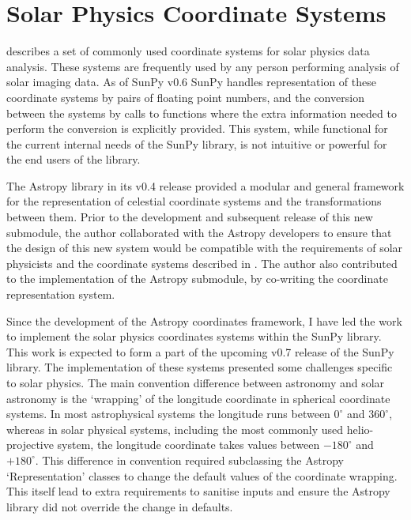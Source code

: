 \documentclass[a4paper,12pt,fourier,authoryear,custommargin]{Classes/PhDThesisPSnPDF}
\begin{document}
\section{Solar Physics Coordinate Systems}

\cite{thompson2006} describes a set of commonly used coordinate systems for solar physics data analysis.
These systems are frequently used by any person performing analysis of solar imaging data.
As of SunPy v0.6 SunPy handles representation of these coordinate systems by pairs of floating point numbers, and the conversion between the systems by calls to functions where the extra information needed to perform the conversion is explicitly provided.
This system, while functional for the current internal needs of the SunPy library, is not intuitive or powerful for the end users of the library.

The Astropy library \citep{theastropycollaboration2013} in its v0.4 release provided a modular and general framework for the representation of celestial coordinate systems and the transformations between them.
Prior to the development and subsequent release of this new submodule, the author collaborated with the Astropy developers to ensure that the design of this new system would be compatible with the requirements of solar physicists and the coordinate systems described in \cite{thompson2006}.
The author also contributed to the implementation of the Astropy submodule, by co-writing the coordinate representation system.

Since the development of the Astropy coordinates framework, I have led the work to implement the solar physics coordinates systems within the SunPy library.
This work is expected to form a part of the upcoming v0.7 release of the SunPy library.
The implementation of these systems presented some challenges specific to solar physics.
The main convention difference between astronomy and solar astronomy is the `wrapping' of the longitude coordinate in spherical coordinate systems.
In most astrophysical systems the longitude runs between $0^\circ$ and $360^\circ$, whereas in solar physical systems, including the most commonly used helio-projective system, the longitude coordinate takes values between $-180^\circ$ and $+180^\circ$.
This difference in convention required subclassing the Astropy `Representation' classes to change the default values of the coordinate wrapping.
This itself lead to extra requirements to sanitise inputs and ensure the Astropy library did not override the change in defaults.
\end{document}
